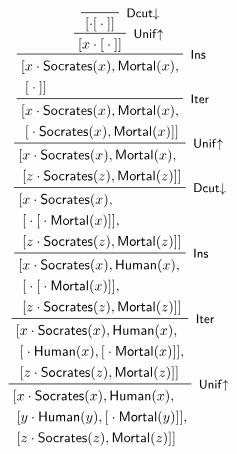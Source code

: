 $$
\R[\rsf{Unif{\ua}}]
{\R[\rsf{Iter}]
{\R[\rsf{Ins}]
{\R[\rsf{Dcut{\da}}]
{\R[\rsf{Unif{\ua}}]
{\R[\rsf{Iter}]
{\R[\rsf{Ins}]
{\R[\rsf{Unif{\ua}}]
{\R[\rsf{Dcut{\da}}]
{}
{[\cdot [{} \cdot {}]]}}
{[x \cdot [{} \cdot {}]]}}
{\begin{aligned}
 [&x \cdot \socrates(x), \mortal(x), \\
  &[{} \cdot {}]]
\end{aligned}}}
{\begin{aligned}
 [&x \cdot \socrates(x), \mortal(x), \\
  &[{} \cdot \socrates(x),\mortal(x)]]
\end{aligned}}}
{\begin{aligned}
 [&x \cdot \socrates(x), \mortal(x), \\
  &[z \cdot \socrates(z),\mortal(z)]]
\end{aligned}}}
{\begin{aligned}
 [&x \cdot \socrates(x), \\
  &[{} \cdot [{} \cdot \mortal(x)]], \\
  &[z \cdot \socrates(z),\mortal(z)]]
\end{aligned}}}
{\begin{aligned}
 [&x \cdot \socrates(x),\human(x), \\
  &[{} \cdot [{} \cdot \mortal(x)]], \\
  &[z \cdot \socrates(z),\mortal(z)]]
\end{aligned}}}
{\begin{aligned}
 [&x \cdot \socrates(x),\human(x), \\
  &[{} \cdot \human(x),[{} \cdot \mortal(x)]], \\
  &[z \cdot \socrates(z),\mortal(z)]]
\end{aligned}}}
{\begin{aligned}
 [&x \cdot \socrates(x),\human(x), \\
  &[y \cdot \human(y),[{} \cdot \mortal(y)]], \\
  &[z \cdot \socrates(z),\mortal(z)]]
\end{aligned}}
$$